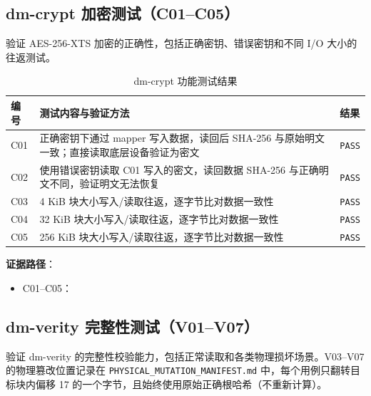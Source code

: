 \subsection{dm-crypt 加密测试（C01--C05）}

验证 AES-256-XTS 加密的正确性，包括正确密钥、错误密钥和不同 I/O 大小的往返测试。

\begin{table}[H]
    \centering
    \caption{dm-crypt 功能测试结果}
    \begin{tabular}{p{}p{}p{}}
        \toprule
        \textbf{编号} & \textbf{测试内容与验证方法} & \textbf{结果} \\
        \midrule
        C01 & 正确密钥下通过 mapper 写入数据，读回后 SHA-256 与原始明文一致；直接读取底层设备验证为密文 & \texttt{PASS} \\
        C02 & 使用错误密钥读取 C01 写入的密文，读回数据 SHA-256 与正确明文不同，验证明文无法恢复 & \texttt{PASS} \\
        C03 & 4 KiB 块大小写入/读取往返，逐字节比对数据一致性 & \texttt{PASS} \\
        C04 & 32 KiB 块大小写入/读取往返，逐字节比对数据一致性 & \texttt{PASS} \\
        C05 & 256 KiB 块大小写入/读取往返，逐字节比对数据一致性 & \texttt{PASS} \\
        \bottomrule
    \end{tabular}
\end{table}

\textbf{证据路径}：
\begin{itemize}
    \item C01--C05：\texttt{}
\end{itemize}

\subsection{dm-verity 完整性测试（V01--V07）}

验证 dm-verity 的完整性校验能力，包括正常读取和各类物理损坏场景。V03--V07 的物理篡改位置记录在 \texttt{PHYSICAL\_MUTATION\_MANIFEST.md} 中，每个用例只翻转目标块内偏移 17 的一个字节，且始终使用原始正确根哈希（不重新计算）。


